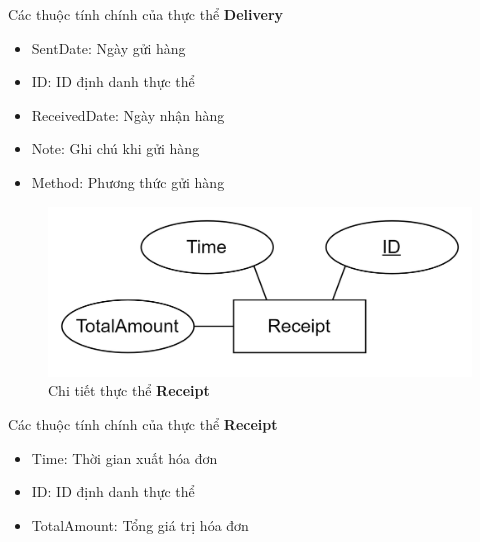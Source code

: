 Các thuộc tính chính của thực thể \textbf{Delivery}
\begin{itemize}
    \item SentDate: Ngày gửi hàng
    \item ID: ID định danh thực thể
    \item ReceivedDate: Ngày nhận hàng
    \item Note: Ghi chú khi gửi hàng
    \item Method: Phương thức gửi hàng
\end{itemize}

\newpage
\begin{figure}[h]
    \centering
    \includegraphics[scale = 0.20]{img/db/receipt.png}
    \vspace{1cm}
    \caption{Chi tiết thực thể \textbf{Receipt}}
    \label{fig:taskAssignment}
\end{figure}
Các thuộc tính chính của thực thể \textbf{Receipt}
\begin{itemize}
    \item Time: Thời gian xuất hóa đơn
    \item ID: ID định danh thực thể
    \item TotalAmount: Tổng giá trị hóa đơn
\end{itemize}

